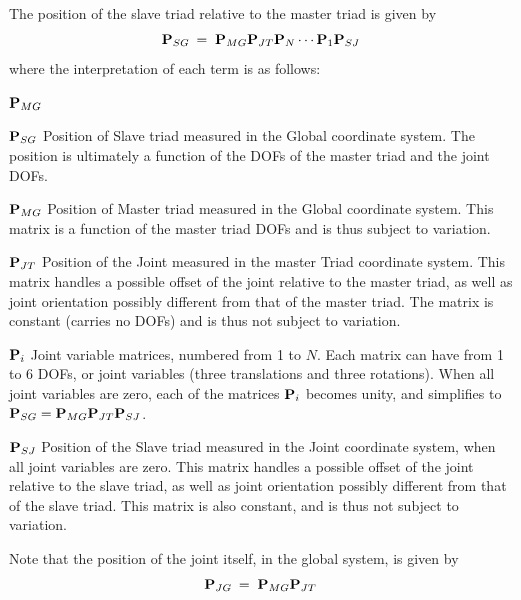The position of the slave triad relative to the master triad is given by
%
\begin{equation}
{\bf P}_{SG} \:=\; {\bf P}_{MG}{\bf P}_{JT}{\bf P}_N\cdots{\bf P}_1{\bf P}_{SJ}
\label{eq:JointDef}
\end{equation}
%
where the interpretation of each term is as follows:
%
\begin{namelist}{${\bf P}_{MG}$}

\item[${\bf P}_{SG}$]
Position of Slave triad measured in the Global coordinate system.
The position is ultimately a function of the DOFs of the master triad
and the joint DOFs.

\item[${\bf P}_{MG}$]
Position of Master triad measured in the Global coordinate system.
This matrix is a function of the master triad DOFs and is thus
subject to variation.

\item[${\bf P}_{JT}$]
Position of the Joint measured in the master Triad coordinate system.
This matrix handles a possible offset of the joint relative to the master triad,
as well as joint orientation possibly different from that of the master triad.
The matrix is constant (carries no DOFs) and is thus not subject to variation.

\item[${\bf P}_i$]
Joint variable matrices, numbered from 1 to $N$.
Each matrix can have from 1 to 6 DOFs, or joint variables
(three translations and three rotations).
When all joint variables are zero, each of the matrices ${\bf P}_i$
becomes unity, and  simplifies to
${\bf P}_{SG} = {\bf P}_{MG}{\bf P}_{JT}{\bf P}_{SJ}$.

\item[${\bf P}_{SJ}$]
Position of the Slave triad measured in the Joint coordinate system,
when all joint variables are zero.
This matrix handles a possible offset of the joint relative to the slave triad,
as well as joint orientation possibly different from that of the slave triad.
This matrix is also constant, and is thus not subject to variation.

\end{namelist}
%
Note that the position of the joint itself, in the global system, is given by
%
\begin{equation}
{\bf P}_{JG} \:=\; {\bf P}_{MG}{\bf P}_{JT}
\label{eq:JointPosGlobSingleMaster}
\end{equation}

